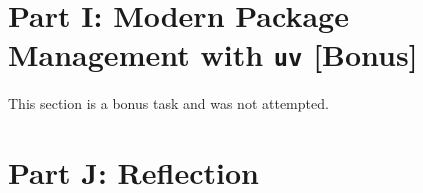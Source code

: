 \documentclass[12pt,a4paper]{article}
\begin{document}
\vspace{24pt}


\section*{Part I: Modern Package Management with \texttt{uv} [Bonus]}

This section is a bonus task and was not attempted.

\vspace{24pt}


\section*{Part J: Reflection}
\end{document}
